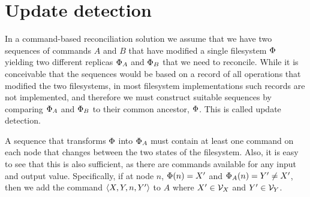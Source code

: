 \documentclass[12pt]{article}
\begin{document}















\section{Update detection}

In a command-based reconciliation solution we assume that we have two sequences of commands
$A$ and $B$ that have modified a single filesystem $\Phi$ yielding two different replicas $\Phi_A$ and $\Phi_B$ that we
need to reconcile. While it is conceivable that the sequences would be based on a record of
all operations that modified the two filesystems, in most filesystem implementations
such records are not implemented, and therefore we must construct suitable sequences
by comparing $\Phi_A$ and $\Phi_B$ to their common ancestor, $\Phi$. This is called update detection.

A sequence that transforms $\Phi$ into $\Phi_A$ must contain at least one command on each node
that changes between the two states of the filesystem. Also, it is easy to see that this is also
sufficient, as there are commands available for any input and output value. 
Specifically, if at node $n$, $\Phi(n)=X'$ and $\Phi_A(n)=Y'\neq X'$, then we add the command $\langle{X,Y,n,Y'}\rangle$ to $A$
where $X'\in\mathcal{V}_{X}$ and $Y'\in\mathcal{V}_{Y}$.
\end{document}
